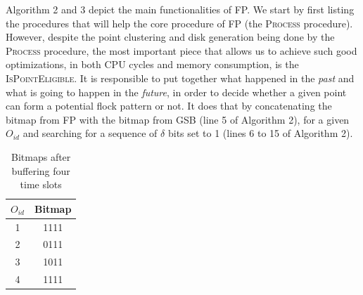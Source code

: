 Algorithm 2 and 3 depict the main functionalities of FP. We start by first listing the procedures that will help the
core procedure of FP (the \textsc{Process} procedure). However, despite the point clustering and disk generation being
done by the \textsc{Process} procedure, the most important piece that allows us to achieve such good optimizations, in
both CPU cycles and memory consumption, is the \textsc{IsPointEligible}. It is responsible to put together what happened
in the \textit{past} and what is going to happen in the \textit{future}, in order to decide whether a given point can
form a potential flock pattern or not. It does that by concatenating the bitmap from FP with the bitmap from GSB (line 5
of Algorithm 2), for a given $O_{id}$ and searching for a sequence of $\delta$ bits set to 1 (lines 6 to 15 of Algorithm
2).

\begin{table}
    \renewcommand{\arraystretch}{1.3}
    \caption{Bitmaps after buffering four time slots}
    \label{tab:bitmaps}
    \centering
    \begin{tabular}{c|c}
        \hline
        $O_{id}$ &   Bitmap\\
        \hline
        \hline
        1        &   1111\\
        \hline
        2        &   0111\\
        \hline
        3        &   1011\\
        \hline
        4        &   1111\\
        \hline
    \end{tabular}
\end{table}

